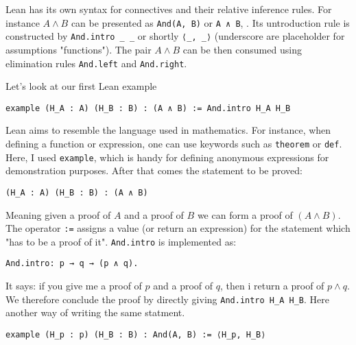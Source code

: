Lean has its own syntax for connectives and their relative inference rules.
For instance $A \land B$ can be presented as \lstinline[language=lean]|And(A, B)| or \lstinline[language=lean]|A ∧ B|,
. Its untroduction rule is constructed by
 \lstinline[language=lean]|And.intro _ _| or shortly
 \lstinline[language=lean]|⟨_, _⟩| (underscore are placeholder for assumptions "functions"). 
 The pair $A \land B$ can be then consumed using elimination 
rules \lstinline[language=lean]|And.left| and \lstinline[language=lean]|And.right|.
\begin{example}
    Let's look at our first Lean example
  \begin{lstlisting}[language=lean]
    example (H_A : A) (H_B : B) : (A ∧ B) := And.intro H_A H_B
  \end{lstlisting}
Lean aims to resemble the language used in mathematics. 
For instance, when defining a function or expression, one can use keywords such as 
\lstinline[language=lean]|theorem| or \lstinline[language=lean]|def|.
Here, I used \lstinline[language=lean]|example|, which is handy for defining anonymous expressions 
for demonstration purposes. 
After that comes the statement to be proved:
\begin{lstlisting}[language=lean]
  (H_A : A) (H_B : B) : (A ∧ B) 
\end{lstlisting}
Meaning given a proof of $A$ and a proof of $B$ we can form a proof of $(A \land B)$.
The operator \lstinline[language=lean]|:=| assigns a value (or return an expression) for the statement which
 "has to be a proof of it".
\lstinline[language=lean]|And.intro| is implemented as:
\begin{lstlisting}[language=lean]
  And.intro: p → q → (p ∧ q).
\end{lstlisting}
It says: if you give me a proof of $p$ and a proof of $q$, 
then i return a proof of $p \land q$.
We therefore conclude the proof by directly giving 
\lstinline[language=lean]|And.intro H_A H_B|.
Here another way of writing the same statment.
\begin{lstlisting}[language=lean]
  example (H_p : p) (H_B : B) : And(A, B) := ⟨H_p, H_B⟩
\end{lstlisting}
\end{example}

